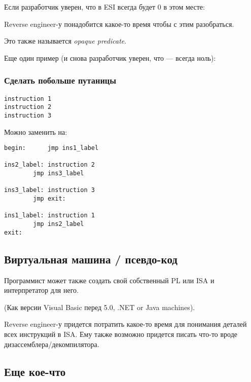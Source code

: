 Если разработчик уверен, что в ESI всегда будет 0 в этом месте:



Reverse engineer-у понадобится какое-то время чтобы с этим разобраться.

Это также называется \emph{opaque predicate}.

Еще один пример (и снова разработчик уверен, что  --- всегда ноль):



\subsubsection{Сделать побольше путаницы}

\begin{lstlisting}
instruction 1
instruction 2
instruction 3
\end{lstlisting}

Можно заменить на:

\begin{lstlisting}[style=customasmx86]
begin:		jmp	ins1_label

ins2_label:	instruction 2
		jmp	ins3_label

ins3_label:	instruction 3
		jmp	exit:

ins1_label:	instruction 1
		jmp	ins2_label
exit:
\end{lstlisting}



\subsection{Виртуальная машина / псевдо-код}

Программист может также создать свой собственный \ac{PL} или \ac{ISA} и интерпретатор для него.

(Как версии Visual Basic перед 5.0, .NET or Java machines).

Reverse engineer-у придется потратить какое-то время для понимания деталей всех инструкций в \ac{ISA}.
Ему также возможно придется писать что-то вроде дизассемблера/декомпилятора.

\subsection{Еще кое-что}

